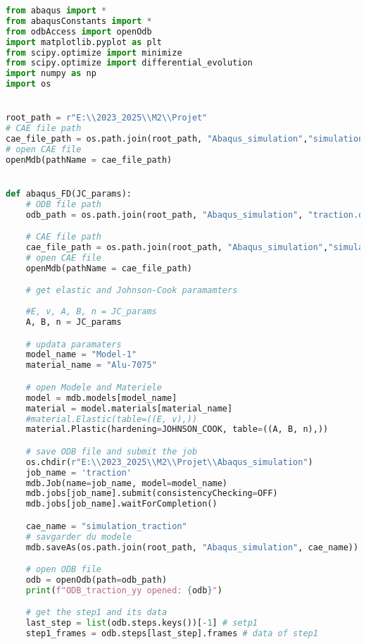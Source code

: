 \documentclass[12pt,a4paper]{article}
\begin{document}
\begin{lstlisting}[language=Python, caption={Optimisation force-déplacement}]
from abaqus import *
from abaqusConstants import *
from odbAccess import openOdb
import matplotlib.pyplot as plt
from scipy.optimize import minimize
from scipy.optimize import differential_evolution
import numpy as np
import os


root_path = r"E:\\2023_2025\\M2\\Projet"
# CAE file path
cae_file_path = os.path.join(root_path, "Abaqus_simulation","simulation_traction.cae")
# open CAE file
openMdb(pathName = cae_file_path)


def abaqus_FD(JC_params):
    # ODB file path
    odb_path = os.path.join(root_path, "Abaqus_simulation", "traction.odb")

    # CAE file path
    cae_file_path = os.path.join(root_path, "Abaqus_simulation","simulation_traction.cae")
    # open CAE file
    openMdb(pathName = cae_file_path)

    # get elastic and Johnson-Cook paramamters
    
    #E, v, A, B, n = JC_params
    A, B, n = JC_params

    # updata paramaters
    model_name = "Model-1"  
    material_name = "Alu-7075"  

    # open Modele and Materiele
    model = mdb.models[model_name]
    material = model.materials[material_name]
    #material.Elastic(table=((E, v),))
    material.Plastic(hardening=JOHNSON_COOK, table=((A, B, n),))

    # save ODB file and submit the job
    os.chdir(r"E:\\2023_2025\\M2\\Projet\\Abaqus_simulation")
    job_name = 'traction'
    mdb.Job(name=job_name, model=model_name)
    mdb.jobs[job_name].submit(consistencyChecking=OFF)
    mdb.jobs[job_name].waitForCompletion()

    cae_name = "simulation_traction"
    # savgarder du modele
    mdb.saveAs(os.path.join(root_path, "Abaqus_simulation", cae_name))

    # open ODB file
    odb = openOdb(path=odb_path)
    print(f"ODB_traction_yy opened: {odb}")

    # get the step1 and its data
    last_step = list(odb.steps.keys())[-1] # setp1
    step1_frames = odb.steps[last_step].frames # data of step1


\end{lstlisting}
\end{document}
